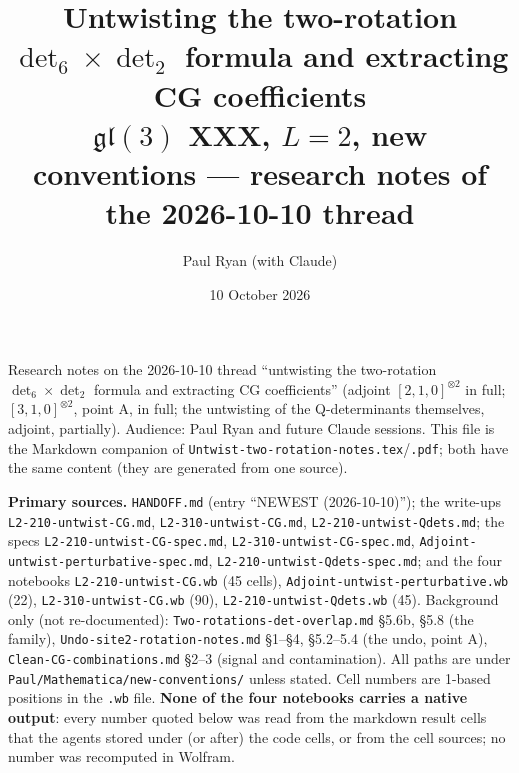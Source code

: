 \documentclass[10pt]{article}
\newcommand{\nb}[1]{\texttt{#1}}
\begin{document}
\title{Untwisting the two-rotation $\det_6\times\det_2$ formula and extracting CG coefficients\\[2pt]\large $\mathfrak{gl}(3)$ XXX, $L=2$, new conventions --- research notes of the 2026-10-10 thread}
\author{Paul Ryan (with Claude)}
\date{10 October 2026}
\maketitle

\setcounter{tocdepth}{1}\tableofcontents
\bigskip
\setcounter{section}{-1}

Research notes on the 2026-10-10 thread ``untwisting the two-rotation $\det_6\times\det_2$ formula and extracting CG coefficients'' (adjoint $[2,1,0]^{\otimes2}$ in full; $[3,1,0]^{\otimes2}$, point A, in full; the untwisting of the Q-determinants themselves, adjoint, partially). Audience: Paul Ryan and future Claude sessions. This file is the Markdown companion of \nb{Untwist-\allowbreak{}two-\allowbreak{}rotation-\allowbreak{}notes.\allowbreak{}tex}/\nb{.\allowbreak{}pdf}; both have the same content (they are generated from one source).

\textbf{Primary sources.} \nb{HANDOFF.\allowbreak{}md} (entry ``NEWEST (2026-10-10)''); the write-ups \nb{L2-\allowbreak{}210-\allowbreak{}untwist-\allowbreak{}CG.\allowbreak{}md}, \nb{L2-\allowbreak{}310-\allowbreak{}untwist-\allowbreak{}CG.\allowbreak{}md}, \nb{L2-\allowbreak{}210-\allowbreak{}untwist-\allowbreak{}Qdets.\allowbreak{}md}; the specs \nb{L2-\allowbreak{}210-\allowbreak{}untwist-\allowbreak{}CG-\allowbreak{}spec.\allowbreak{}md}, \nb{L2-\allowbreak{}310-\allowbreak{}untwist-\allowbreak{}CG-\allowbreak{}spec.\allowbreak{}md}, \nb{Adjoint-\allowbreak{}untwist-\allowbreak{}perturbative-\allowbreak{}spec.\allowbreak{}md}, \nb{L2-\allowbreak{}210-\allowbreak{}untwist-\allowbreak{}Qdets-\allowbreak{}spec.\allowbreak{}md}; and the four notebooks \nb{L2-\allowbreak{}210-\allowbreak{}untwist-\allowbreak{}CG.\allowbreak{}wb} (45 cells), \nb{Adjoint-\allowbreak{}untwist-\allowbreak{}perturbative.\allowbreak{}wb} (22), \nb{L2-\allowbreak{}310-\allowbreak{}untwist-\allowbreak{}CG.\allowbreak{}wb} (90), \nb{L2-\allowbreak{}210-\allowbreak{}untwist-\allowbreak{}Qdets.\allowbreak{}wb} (45). Background only (not re-documented): \nb{Two-\allowbreak{}rotations-\allowbreak{}det-\allowbreak{}overlap.\allowbreak{}md} \S{}5.6b, \S{}5.8 (the family), \nb{Undo-\allowbreak{}site2-\allowbreak{}rotation-\allowbreak{}notes.\allowbreak{}md} \S{}1--\S{}4, \S{}5.2--5.4 (the undo, point A), \nb{Clean-\allowbreak{}CG-\allowbreak{}combinations.\allowbreak{}md} \S{}2--3 (signal and contamination). All paths are under \nb{Paul/\allowbreak{}Mathematica/\allowbreak{}new-\allowbreak{}conventions/\allowbreak{}} unless stated. Cell numbers are 1-based positions in the \nb{.\allowbreak{}wb} file. \textbf{None of the four notebooks carries a native output}: every number quoted below was read from the markdown result cells that the agents stored under (or after) the code cells, or from the cell sources; no number was recomputed in Wolfram.
\end{document}
